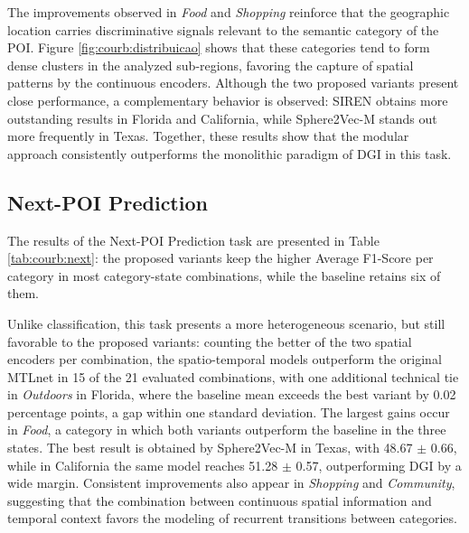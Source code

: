 

The improvements observed in \textit{Food} and \textit{Shopping} reinforce that the geographic location carries discriminative signals relevant to the semantic category of the POI. Figure \ref{fig:courb:distribuicao} shows that these categories tend to form dense clusters in the analyzed sub-regions, favoring the capture of spatial patterns by the continuous encoders. Although the two proposed variants present close performance, a complementary behavior is observed: SIREN obtains more outstanding results in Florida and California, while Sphere2Vec-M stands out more frequently in Texas. Together, these results show that the modular approach consistently outperforms the monolithic paradigm of DGI in this task.

\subsection{Next-POI Prediction}

The results of the Next-POI Prediction task are presented in Table \ref{tab:courb:next}: the proposed variants keep the higher Average F1-Score per category in most category-state combinations, while the baseline retains six of them.

Unlike classification, this task presents a more heterogeneous scenario, but still favorable to the proposed variants: counting the better of the two spatial encoders per combination, the spatio-temporal models outperform the original MTLnet in 15 of the 21 evaluated combinations, with one additional technical tie in \textit{Outdoors} in Florida, where the baseline mean exceeds the best variant by 0.02 percentage points, a gap within one standard deviation. The largest gains occur in \textit{Food}, a category in which both variants outperform the baseline in the three states. The best result is obtained by Sphere2Vec-M in Texas, with 48.67 $\pm$ 0.66, while in California the same model reaches 51.28 $\pm$ 0.57, outperforming DGI by a wide margin. Consistent improvements also appear in \textit{Shopping} and \textit{Community}, suggesting that the combination between continuous spatial information and temporal context favors the modeling of recurrent transitions between categories.

